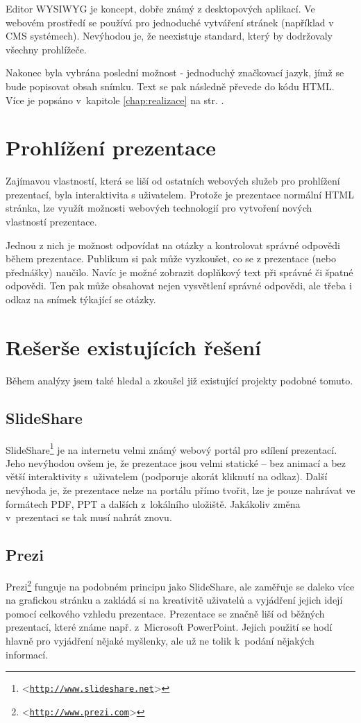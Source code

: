 \documentclass[11pt,twoside,a4paper]{book}
\let\oldUrl\url									%
\renewcommand\url[1]{<\texttt{\oldUrl{#1}}>}
\begin{document}
Editor WYSIWYG je koncept, dobře známý z desktopových aplikací. Ve webovém prostředí se používá pro jednoduché vytváření stránek (například v CMS systémech). Nevýhodou je, že neexistuje standard, který by dodržovaly všechny prohlížeče.

Nakonec byla vybrána poslední možnost - jednoduchý značkovací jazyk, jímž se bude popisovat obsah snímku. Text se pak následně převede do kódu HTML. Více je popsáno v~kapitole \ref{chap:realizace}  na str. \pageref{chap:realizace}.

\section{Prohlížení prezentace}
Zajímavou vlastností, která se liší od ostatních webových služeb pro prohlížení prezentací, byla interaktivita s uživatelem. Protože je prezentace normální HTML stránka, lze využít možnosti webových technologií pro vytvoření nových vlastností prezentace.

Jednou z nich je možnost odpovídat na otázky a kontrolovat správné odpovědi během prezentace. Publikum si pak může vyzkoušet, co se z prezentace (nebo přednášky) naučilo. Navíc je možné zobrazit doplňkový text při správné či špatné odpovědi. Ten pak může obsahovat nejen vysvětlení správné odpovědi, ale třeba i odkaz na snímek týkající se otázky.

\section{Rešerše existujících řešení}
Během analýzy jsem také hledal a zkoušel již existující projekty podobné tomuto.

\subsection{SlideShare}
SlideShare\footnote{\url{http://www.slideshare.net}} je na internetu velmi známý webový portál pro sdílení prezentací. Jeho nevýhodou ovšem je, že
prezentace jsou velmi statické – bez animací a bez větší interaktivity s~uživatelem (podporuje akorát kliknutí na
odkaz). Další nevýhoda je, že prezentace nelze na portálu přímo tvořit, lze je pouze nahrávat ve formátech PDF, PPT a
dalších z~lokálního uložiště. Jakákoliv změna v~prezentaci se tak musí nahrát znovu.

\subsection{Prezi}
Prezi\footnote{\url{http://www.prezi.com}} funguje na podobném principu jako SlideShare, ale zaměřuje se daleko více na grafickou stránku a zakládá si na
kreativitě uživatelů a vyjádření jejich idejí pomocí celkového vzhledu prezentace. Prezentace se značně liší od běžných
prezentací, které známe např. z~Microsoft PowerPoint. Jejich použití se hodí hlavně pro vyjádření nějaké myšlenky, ale už ne tolik k~podání nějakých informací.
\end{document}
